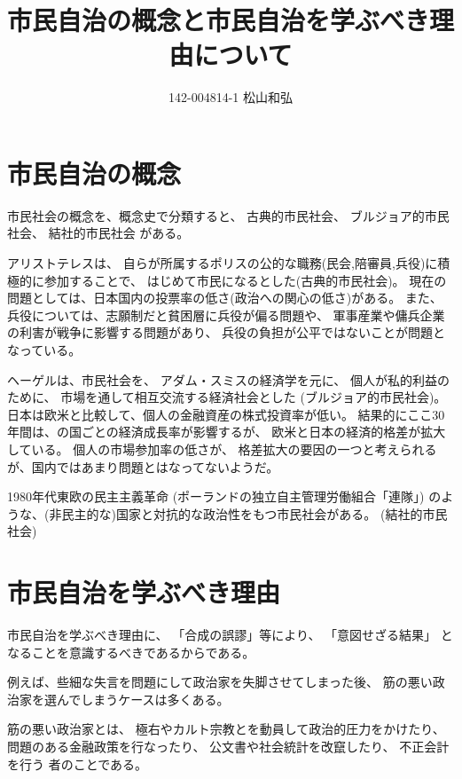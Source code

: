 \documentclass{jsarticle}
\begin{document}
\title{市民自治の概念と市民自治を学ぶべき理由について}
\author{142-004814-1 松山和弘}
\maketitle

\section{市民自治の概念}

市民社会の概念を、概念史で分類すると、
古典的市民社会、
ブルジョア的市民社会、
結社的市民社会
がある。

アリストテレスは、
自らが所属するポリスの公的な職務(民会,陪審員,兵役)に積極的に参加することで、
はじめて市民になるとした(古典的市民社会)。
現在の問題としては、日本国内の投票率の低さ(政治への関心の低さ)がある。
また、兵役については、志願制だと貧困層に兵役が偏る問題や、
軍事産業や傭兵企業の利害が戦争に影響する問題があり、
兵役の負担が公平ではないことが問題となっている。

ヘーゲルは、市民社会を、
アダム・スミスの経済学を元に、
個人が私的利益のために、
市場を通して相互交流する経済社会とした
(ブルジョア的市民社会)。
日本は欧米と比較して、個人の金融資産の株式投資率が低い。
結果的にここ30年間は、の国ごとの経済成長率が影響するが、
欧米と日本の経済的格差が拡大している。
個人の市場参加率の低さが、
格差拡大の要因の一つと考えられるが、国内ではあまり問題とはなってないようだ。

1980年代東欧の民主主義革命
(ポーランドの独立自主管理労働組合「連隊」)
のような、(非民主的な)国家と対抗的な政治性をもつ市民社会がある。
(結社的市民社会)



\section{市民自治を学ぶべき理由}

市民自治を学ぶべき理由に、
「合成の誤謬」等により、
「意図せざる結果」
となることを意識するべきであるからである。

例えば、些細な失言を問題にして政治家を失脚させてしまった後、
筋の悪い政治家を選んでしまうケースは多くある。

筋の悪い政治家とは、
極右やカルト宗教とを動員して政治的圧力をかけたり、
問題のある金融政策を行なったり、
公文書や社会統計を改竄したり、
不正会計を行う
者のことである。
\end{document}
